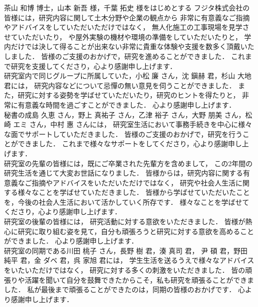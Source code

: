 茶山 和博 博士，山本 新吾 様，千葉 拓史 様をはじめとする
フジタ株式会社の皆様には，研究内容に関して土木分野や企業の観点から
非常に有意義なご指摘やアドバイスをしていただいただけではなく，
無人化施工の工事現場を見学させていただいたり，
や屋外実験の機材や環境の準備をしていただいたりと，
学内だけでは決して得ることが出来ない非常に貴重な体験や支援を数多く頂戴いたしました．
皆様のご支援のおかげで，研究を進めることができました．
これまで研究を支援してくださり，心より感謝申し上げます．
\\

研究室内で同じグループに所属していた，小松 廉 さん，沈 鎭赫 君，杉山 大地 君には，
研究内容などについて忌憚の無い意見を伺うことができました．
また，研究に対する姿勢を学ばせていただいたり，研究のヒントを得たりと，
非常に有意義な時間を過ごすことができました．
心より感謝申し上げます．
\\



秘書の成島 久恵 さん，野上 真祐子 さん，乙津 裕子 さん，大野 朋美 さん，松崎 エミ さん，中村 惠 さんには，
研究室生活において事務手続きを中心に様々な面でサポートしていただきました．
皆様のご支援のおかげで，研究を行うことができました．
これまで様々なサポートをしてくださり，心より感謝申し上げます．
\\


研究室の先輩の皆様には，既にご卒業された先輩方を含めまして，
この2年間の研究生活を通じて大変お世話になりました．
皆様からは，研究内容に関する有意義なご指摘やアドバイスをいただいただけではなく，
研究や社会人生活に関する様々なことを学ばせていただきました．
皆様から学ばせていただいたことを，今後の社会人生活において活かしていく所存です．
様々なことを学ばせてくださり，心より感謝申し上げます．
\\

研究室の後輩の皆様には，
研究活動に対する意欲をいただきました．
皆様が熱心に研究に取り組む姿を見て，自分も頑張ろうと研究に対する意欲を高めることができました．
心より感謝申し上げます．
\\

研究室の同期である川田 桃子 さん，長野 樹 君，湊 真司 君，	
尹 碩 君，野田 純平 君，金 ダベ 君，呉 家旭 君には，
学生生活を送るうえで様々なアドバイスをいたいただけではなく，
研究に対する多くの刺激をいただきました．
皆の頑張りや活躍を聞いて自分を鼓舞できたからこそ，私も研究を頑張ることができました．
私が最後まで頑張ることができたのは，同期の皆様のおかげです．
心より感謝申し上げます．
\\

